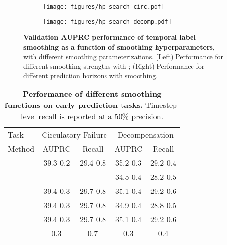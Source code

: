 \documentclass[nohyperref]{article}
\begin{document}
\begin{figure}[h]
\centering
\begin{subfigure}[b]{0.9\textwidth}
  \centering
  \texttt{[image: figures/hp\_search\_circ.pdf]}
  \caption{} 
  \label{fig:smoothing_hypers_circ}
\end{subfigure}
\vspace{0.5em}
\begin{subfigure}[b]{0.9\textwidth}
  \centering
    \texttt{[image: figures/hp\_search\_decomp.pdf]}
  \caption{} 
  \label{fig:smoothing_hypers_decomp}
\end{subfigure}
\caption{{\textbf{Validation AUPRC performance of temporal label smoothing as a function of smoothing hyperparameters}, with different smoothing parameterizations. (Left) Performance for different smoothing strengths  with ; (Right)  Performance for different prediction horizons  with  smoothing.}} \label{fig:smoothing_hyperparams}
\end{figure}
\begin{comment}
    \vspace{0.5em}
\begin{subfigure}[b]{0.9\textwidth}
  \centering
    \texttt{[image: figures/hp\_search\_resp.pdf]}
  \caption{\centering {Respiratory failure.}} 
  \label{fig:smoothing_hypers_resp}
\end{subfigure}
\end{comment}


\begin{table}[h] \centering
    \caption{\textbf{Performance of different smoothing functions on early prediction tasks.} Timestep-level recall is reported at a 50\% precision.} \label{tab:other_fn}
\begin{tabular}{lcccc}
\toprule

 Task & \multicolumn{2}{c}{Circulatory Failure} & \multicolumn{2}{c}{Decompensation} \\
 \cmidrule(lr){2-3} \cmidrule(lr){4-5}
Method &         AUPRC &   Recall &         AUPRC &   Recall \\
\midrule
              &             39.3  0.2 &             29.4  0.8 &             35.2  0.3 &             29.2  0.4  \\
{} & {} & {} & {34.5  0.4} &  {28.2  0.5}  \\
      &  39.4  0.3 &             29.7  0.8 &             35.1  0.4 &             29.2  0.6  \\
     & 39.4  0.3 &             29.7  0.8 &             34.9  0.4 &             28.8  0.5 \\
{}      &  {39.4  0.3} &             {29.7  0.8} &             {35.1  0.4} &             {29.2  0.6}  \\
   &    0.3 &    0.7 &    0.3 &    0.4  \\
\bottomrule
\end{tabular}\end{table}
\end{document}
